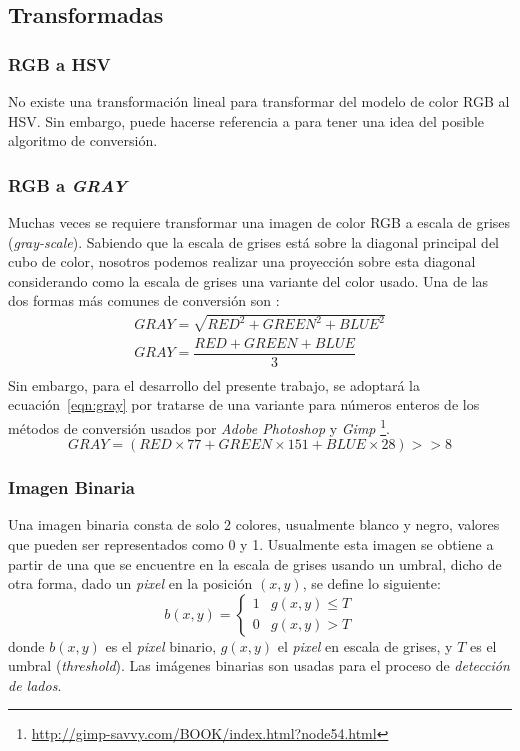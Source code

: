   \subsection{Transformadas}
  	\subsubsection{RGB a HSV}
  		No existe una transformación lineal para transformar del modelo de color
  		RGB al HSV. Sin embargo, puede hacerse referencia a \cite{Eugene:Color} 
  		para tener una idea del posible algoritmo de conversión.
    \subsubsection{RGB a \textit{GRAY}}
      Muchas veces se requiere transformar una imagen de color RGB a escala 
      de grises (\textit{gray-scale}). Sabiendo que la escala de grises está 
      sobre la diagonal principal del cubo de color, nosotros podemos realizar 
      una proyección sobre esta diagonal considerando como la escala de grises
      una variante del color usado.
  		Una de las dos formas más comunes de conversión son \cite{GRAY7:web}:
      \begin{eqnarray}
	      GRAY = \sqrt{RED^2 + GREEN^2 + BLUE^2}\\
	      GRAY = \dfrac{RED + GREEN + BLUE}{3}\\
      \end{eqnarray}
      Sin embargo, para el desarrollo del presente trabajo, se adoptará la 
      ecuación~\ref{eqn:gray} por tratarse de una variante para números 
      enteros\cite{GRAYused:web} de los métodos de conversión usados por 
      \textit{Adobe Photoshop} y \textit{Gimp}
      \footnote{\url{http://gimp-savvy.com/BOOK/index.html?node54.html}}.
      \begin{equation}
      GRAY = (RED \times 77 + GREEN \times 151 + BLUE \times 28 ) >> 8
      \label{eqn:gray}
      \end{equation}
      
    \subsubsection{Imagen Binaria}
      Una imagen binaria consta de solo 2 colores, usualmente blanco y negro, 
      valores que pueden ser representados como 0 y 1. Usualmente esta imagen 
      se obtiene a partir de una que se encuentre en la escala de grises 
      usando un umbral, dicho de otra forma, dado un \textit{pixel} en la 
      posición $(x,y)$, se define lo siguiente:
      \[
        b(x,y) =
        \begin{cases}
          1 & g(x,y) \leq T \\
          0 & g(x,y) > T
        \end{cases}
      \]
      donde $b(x,y)$ es el \textit{pixel} binario, $g(x,y)$ el \textit{pixel} 
      en escala de grises, y $T$ es el umbral (\textit{threshold}).
      Las imágenes binarias son usadas para el proceso de \textit{detección de
      lados}.
